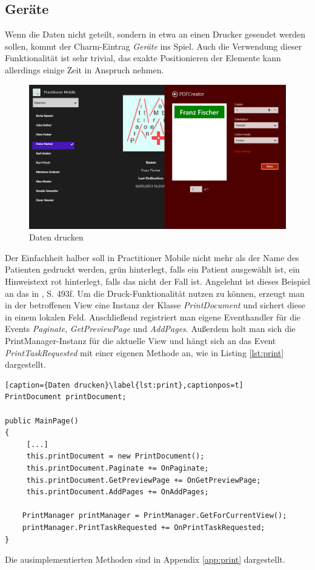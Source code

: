 \documentclass[a4paper,bibtotoc,oneside]{scrbook}
\begin{document}
\subsection[Geräte]{Geräte}
Wenn die Daten nicht geteilt, sondern in etwa an einen Drucker gesendet werden sollen, kommt der Charm-Eintrag \textit{Geräte} ins Spiel. Auch die Verwendung dieser Funktionalität ist sehr trivial, das exakte Positionieren der Elemente kann allerdings einige Zeit in Anspruch nehmen.
\begin{figure}[htbp]
\centering
\includegraphics[scale=0.4]{images/print.png}
\caption[Daten drucken]{Daten drucken}\label{img:print}
\end{figure}
\newline
\newline
Der Einfachheit halber soll in Practitioner Mobile nicht mehr als der Name des Patienten gedruckt werden, grün hinterlegt, falls ein Patient ausgewählt ist, ein Hinweistext rot hinterlegt, falls das nicht der Fall ist. Angelehnt ist dieses Beispiel an das in \cite{ana12}, S. 493f.
\newline
\newline
Um die Druck-Funktionalität nutzen zu können, erzeugt man in der betroffenen View eine Instanz der Klasse \textit{PrintDocument} und sichert diese in einem lokalen Feld.
Anschließend registriert man eigene Eventhandler für die Events \textit{Paginate}, \textit{GetPreviewPage} und \textit{AddPages}.
\newline
Außerdem holt man sich die PrintManager-Instanz für die aktuelle View und hängt sich an das Event \textit{PrintTaskRequested} mit einer eigenen Methode an, wie in Listing \ref{lst:print} dargestellt.
\begin{lstlisting}[caption={Daten drucken}\label{lst:print},captionpos=t]
PrintDocument printDocument;

public MainPage()
{
     [...]
     this.printDocument = new PrintDocument();
     this.printDocument.Paginate += OnPaginate;
     this.printDocument.GetPreviewPage += OnGetPreviewPage;
     this.printDocument.AddPages += OnAddPages;
 
    PrintManager printManager = PrintManager.GetForCurrentView();
    printManager.PrintTaskRequested += OnPrintTaskRequested;
}
\end{lstlisting}
Die ausimplementierten Methoden sind in Appendix \ref{app:print} dargestellt.
\end{document}
